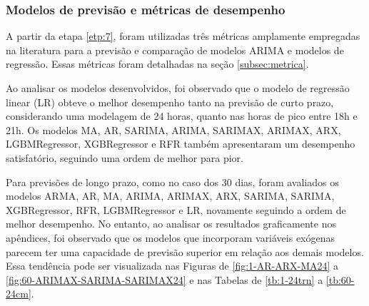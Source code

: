 \subsubsection{Modelos de previs\~ao e m\'etricas de desempenho}\label{subsubsec:modelos}

A partir da etapa \ref{etp:7}, foram utilizadas três métricas amplamente empregadas na literatura para a previsão e comparação de modelos ARIMA e modelos de regressão. Essas métricas foram detalhadas na seção \ref{subsec:metrica}.

Ao analisar os modelos desenvolvidos, foi observado que o modelo de regressão linear (LR) obteve o melhor desempenho tanto na previsão de curto prazo, considerando uma modelagem de 24 horas, quanto nas horas de pico entre 18h e 21h. Os modelos MA, AR, SARIMA, ARIMA, SARIMAX, ARIMAX, ARX, LGBMRegressor, XGBRegressor e RFR também apresentaram um desempenho satisfatório, seguindo uma ordem de melhor para pior.

Para previsões de longo prazo, como no caso dos 30 dias, foram avaliados os modelos ARMA, AR, MA, ARIMA, ARIMAX, ARX, SARIMA, SARIMA, XGBRegressor, RFR, LGBMRegressor e LR, novamente seguindo a ordem de melhor desempenho. No entanto, ao analisar os resultados graficamente nos apêndices, foi observado que os modelos que incorporam variáveis exógenas parecem ter uma capacidade de previsão superior em relação aos demais modelos. Essa tendência pode ser visualizada nas Figuras de \ref{fig:1-AR-ARX-MA24} a \ref{fig:60-ARIMAX-SARIMA-SARIMAX24} e nas Tabelas de \ref{tb:1-24trn} a \ref{tb:60-24cm}.
